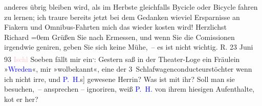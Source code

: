                anderes {\pb}übrig bleiben wird, als im
               Herbste gleichfalls Bycicle oder Bicycle fahren zu lernen; ich traure bereits jetzt
               bei dem Gedanken wieviel Ersparnisse an Fiakern und Omnibus-Fahrten mich das wieder
               kosten wird!\pend
           \pstart
           Herzlichst{\\[\baselineskip]}\spacefill\mbox{Richard}\pend
           \leftskip=0em{}\pstart
           \noindent{}Grüßen Sie nach Ermessen, und wenn Sie die Comissionen irgendwie geniren, geben
                  Sie sich keine Mühe, – es ist nicht wichtig.\pend
           \pstart
           \raggedleft{}R.\pend
           \pstart
           \noindent{}23 Juni 93 \textcolor{pink}{Ischl}{}\ledrightnote{\textcolor{pink}{Bad Ischl}}\pend
           \pstart
           {\pb}Soeben fällt mir ein\substVorne{}\textsuperscript{,}\substDazwischen{}:\substHinten{} Gestern saß in der Theater-Loge ein Fräulein »\textcolor{blue}{Wreden}{}\ledrightnote{\textcolor{blue}{Grethe Wreden}}«, mir »wolbekannt«, eine der
                  3 Schlafwagenconducteurstöchter wenn ich nicht irre, und \textcolor{blue}{P. H.}{}\ledrightnote{\textcolor{blue}{Paul Horn}}{[}s{]} gewesene Herrin? Was ist mit ihr? Soll man sie besuchen, –
                  ansprechen – ignoriren, weiß \textcolor{blue}{P. H.}{}\ledrightnote{\textcolor{blue}{Paul Horn}} von ihrem
                  hiesigen Aufenthalte, ko{\geminationm}t er her?\pend
           \endnumbering{}  
      